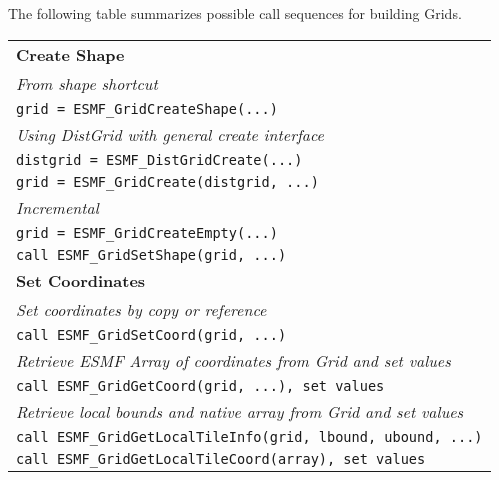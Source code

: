 The following table summarizes possible call sequences
for building Grids.

\begin{tabular}{|l|}
\hline
{\bf Create Shape} \\
{\it From shape shortcut} \\
{\tt grid = ESMF\_GridCreateShape(...)} \\
{\it Using DistGrid with general create interface} \\
{\tt distgrid = ESMF\_DistGridCreate(...)} \\
{\tt grid = ESMF\_GridCreate(distgrid, ...)} \\
{\it Incremental} \\
{\tt grid = ESMF\_GridCreateEmpty(...)} \\
{\tt call ESMF\_GridSetShape(grid, ...)} \\ \hline
{\bf Set Coordinates} \\
{\it Set coordinates by copy or reference} \\
{\tt call ESMF\_GridSetCoord(grid, ...)} \\
{\it Retrieve ESMF Array of coordinates from Grid and set values} \\
{\tt call ESMF\_GridGetCoord(grid, ...), set values} \\
{\it Retrieve local bounds and native array from Grid and set values} \\
{\tt call ESMF\_GridGetLocalTileInfo(grid, lbound, ubound, ...)} \\
{\tt call ESMF\_GridGetLocalTileCoord(array), set values} \\ \hline
\end{tabular}
